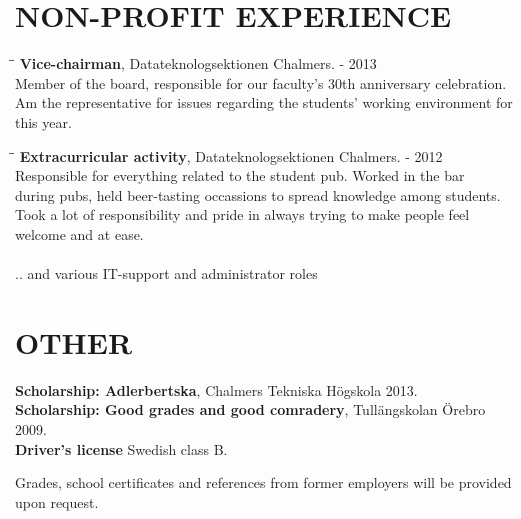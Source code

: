 \documentclass[11pt]{res}
\begin{document}
\begin{resume}
\section{NON-PROFIT EXPERIENCE}  
\vspace{-0.1in}	
	\begin{tabbing}
		\hspace{2.3in}\= \hspace{2.6in}\= \kill %
		{\bf  Vice-chairman}, Datateknologsektionen Chalmers. \>  - 2013\\
		Member of the board, responsible for our faculty's 30th anniversary celebration. \\ Am the representative for issues regarding the students' working environment for this year.
	\end{tabbing}
\vspace{-30pt}

	\begin{tabbing}
		\hspace{2.3in}\= \hspace{2.6in}\= \kill %
		{\bf  Extracurricular activity}, Datateknologsektionen Chalmers. \>  - 2012\\
		Responsible for everything related to the student pub. Worked in the bar \\ during pubs, held beer-tasting occassions to spread knowledge among students. \\ Took a lot of responsibility and pride in always trying to make people feel welcome and at ease. \\\\
 	.. and various IT-support and administrator roles
	\end{tabbing}

\section{OTHER}          
    {\bf Scholarship: Adlerbertska}, Chalmers Tekniska Högskola 2013. \\
    {\bf Scholarship: Good grades and good comradery}, Tullängskolan Örebro 2009. \\
    {\bf Driver's license} Swedish class B. 

Grades, school certificates and references from former employers will be provided upon request. 

\end{resume}
\end{document}
